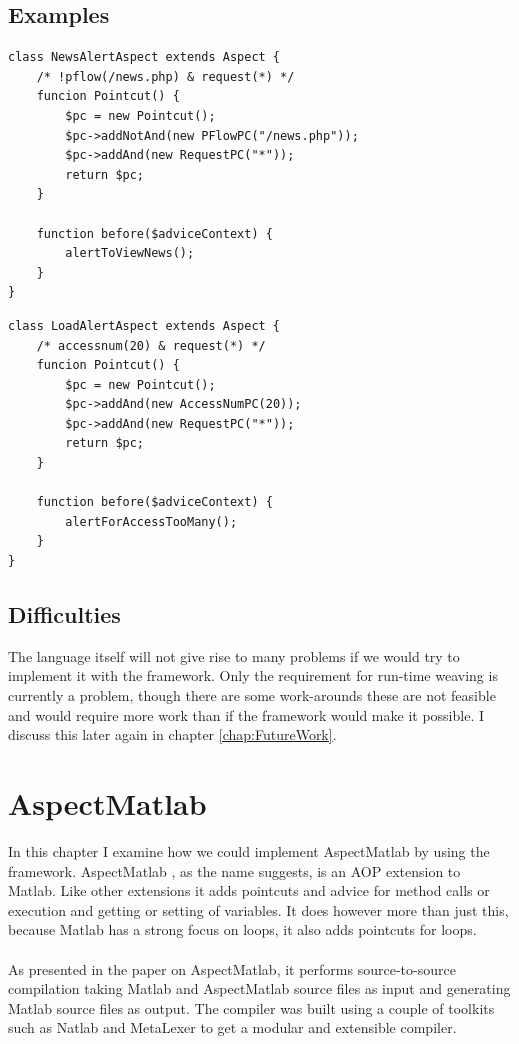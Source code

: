 \documentclass[a4paper]{report}
\begin{document}
\section{Examples}
\begin{lstlisting}[caption=An advice to alert the user to check the newspage.,label=lst:AOWP_ExampleNews]
class NewsAlertAspect extends Aspect {
	/* !pflow(/news.php) & request(*) */	
	funcion Pointcut() {
		$pc = new Pointcut();
		$pc->addNotAnd(new PFlowPC("/news.php"));
		$pc->addAnd(new RequestPC("*"));
		return $pc;
	}
	
	function before($adviceContext) {
		alertToViewNews();
	}
}
\end{lstlisting}
\begin{lstlisting}[caption=An advice that alerts on heavy load.,label=lst:AOWP_ExampleLoad]
class LoadAlertAspect extends Aspect {
	/* accessnum(20) & request(*) */	
	funcion Pointcut() {
		$pc = new Pointcut();
		$pc->addAnd(new AccessNumPC(20));
		$pc->addAnd(new RequestPC("*"));
		return $pc;
	}
	
	function before($adviceContext) {
		alertForAccessTooMany();
	}
}
\end{lstlisting}
\section{Difficulties}
The language itself will not give rise to many problems if we would try to implement it with the framework. Only the requirement for run-time weaving is currently a problem, though there are some work-arounds these are not feasible and would require more work than if the framework would make it possible. I discuss this later again in chapter \ref{chap:FutureWork}.

\chapter{AspectMatlab}
\label{chap:AspectMatlab}
In this chapter I examine how we could implement AspectMatlab by using the framework. AspectMatlab \cite{aslam_aspectmatlab:_2010}, as the name suggests, is an AOP extension to Matlab. Like other extensions it adds pointcuts and advice for method calls or execution and getting or setting of variables. It does however more than just this, because Matlab has a strong focus on loops, it also adds pointcuts for loops.\\
\\
As presented in the paper on AspectMatlab, it performs source-to-source compilation taking Matlab and AspectMatlab source files as input and generating Matlab source files as output. The compiler was built using a couple of toolkits such as Natlab and MetaLexer to get a modular and extensible compiler.
\end{document}

